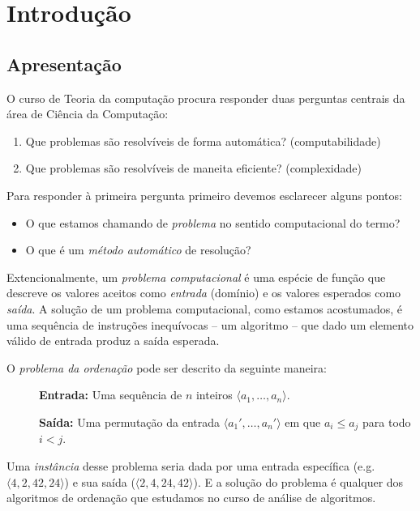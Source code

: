 \chapter{Introdução}
\label{cha:intro}

\section{Apresentação}
\label{sec:apresentacao}

O curso de Teoria da computação procura responder duas perguntas centrais da área de Ciência da Computação:
\begin{enumerate}
\item Que problemas são resolvíveis de forma automática? (computabilidade)
\item Que problemas são resolvíveis de maneita eficiente? (complexidade)
\end{enumerate}

Para responder à primeira pergunta primeiro devemos esclarecer alguns pontos:
\begin{itemize}
\item O que estamos chamando de {\em problema} no sentido computacional do termo?
\item O que é um {\em método automático} de resolução?
\end{itemize}

Extencionalmente, um {\em problema computacional} é uma espécie de função que descreve os valores aceitos como {\em entrada} (domínio) e os valores esperados como {\em saída}.
A solução de um problema computacional, como estamos acostumados, é uma sequência de instruções inequívocas -- um algoritmo -- que dado um elemento válido de entrada produz a saída esperada.

\begin{example}
O {\em problema da ordenação} pode ser descrito da seguinte maneira:

\begin{description}
\item[] {\bf Entrada:} Uma sequência de $n$ inteiros $\langle a_1, \dots, a_n \rangle$.
\item[] {\bf Saída:} Uma permutação da entrada $\langle a_1', \dots, a_n' \rangle$ em que $a_i \leq a_j$ para todo $i < j$.
\end{description}

Uma {\em instância} desse problema seria dada por uma entrada específica (e.g. $\langle 4, 2, 42, 24 \rangle$) e sua saída ($\langle 2, 4, 24, 42 \rangle$).
E a solução do problema é qualquer dos algoritmos de ordenação que estudamos no curso de análise de algoritmos.
\end{example}

